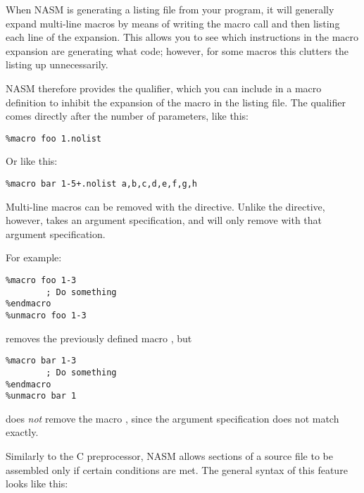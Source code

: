 
When NASM is generating a listing file from your program, it will
generally expand multi-line macros by means of writing the macro
call and then listing each line of the expansion. This allows you to
see which instructions in the macro expansion are generating what
code; however, for some macros this clutters the listing up
unnecessarily.

NASM therefore provides the  qualifier, which you can
include in a macro definition to inhibit the expansion of the macro
in the listing file. The  qualifier comes directly after
the number of parameters, like this:

\begin{lstlisting}
%macro foo 1.nolist
\end{lstlisting}

Or like this:

\begin{lstlisting}
%macro bar 1-5+.nolist a,b,c,d,e,f,g,h
\end{lstlisting}


Multi-line macros can be removed with the  directive.
Unlike the  directive, however,  takes an
argument specification, and will only remove  with
that argument specification.

For example:

\begin{lstlisting}
%macro foo 1-3
        ; Do something
%endmacro
%unmacro foo 1-3
\end{lstlisting}

removes the previously defined macro , but

\begin{lstlisting}
%macro bar 1-3
        ; Do something
%endmacro
%unmacro bar 1
\end{lstlisting}

does \emph{not} remove the macro , since the argument
specification does not match exactly.


Similarly to the C preprocessor, NASM allows sections of a source
file to be assembled only if certain conditions are met. The general
syntax of this feature looks like this:

